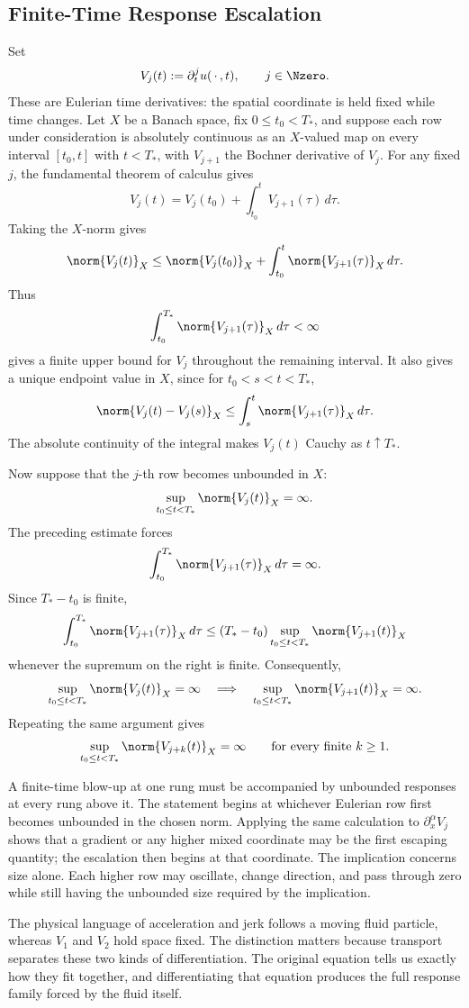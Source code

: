 
\subsection{Finite-Time Response Escalation}\label{sub:FiniteTimeResponseEscalation}

Set
\[
  V_j(t)
  :=
  \partial_t^j u(\,\cdot\,,t),
  \qquad
  j\in\Nzero.
\]
These are Eulerian time derivatives: the spatial coordinate is held fixed while time changes.
Let \(X\) be a Banach space, fix \(0\leq t_0<T_*\), and suppose each row under consideration is absolutely continuous as an \(X\)-valued map on every interval \([t_0,t]\) with \(t<T_*\), with \(V_{j+1}\) the Bochner derivative of \(V_j\).
For any fixed \(j\), the fundamental theorem of calculus gives
\[
  V_j(t)
  =
  V_j(t_0)
  +
  \int_{t_0}^{t}V_{j+1}(\tau)\,d\tau.
\]
Taking the \(X\)-norm gives
\[
  \norm{V_j(t)}_X
  \leq
  \norm{V_j(t_0)}_X
  +
  \int_{t_0}^{t}\norm{V_{j+1}(\tau)}_X\,d\tau.
\]
Thus
\[
  \int_{t_0}^{T_*}\norm{V_{j+1}(\tau)}_X\,d\tau
  <
  \infty
\]
gives a finite upper bound for \(V_j\) throughout the remaining interval.
It also gives a unique endpoint value in \(X\), since for \(t_0<s<t<T_*\),
\[
  \norm{V_j(t)-V_j(s)}_X
  \leq
  \int_s^t\norm{V_{j+1}(\tau)}_X\,d\tau.
\]
The absolute continuity of the integral makes \(V_j(t)\) Cauchy as \(t\uparrow T_*\).

Now suppose that the \(j\)-th row becomes unbounded in \(X\):
\[
  \sup_{t_0\leq t<T_*}
  \norm{V_j(t)}_X
  =
  \infty.
\]
The preceding estimate forces
\[
  \int_{t_0}^{T_*}
  \norm{V_{j+1}(\tau)}_X
  \,d\tau
  =
  \infty.
\]
Since \(T_*-t_0\) is finite,
\[
  \int_{t_0}^{T_*}
  \norm{V_{j+1}(\tau)}_X
  \,d\tau
  \leq
  (T_*-t_0)
  \sup_{t_0\leq t<T_*}
  \norm{V_{j+1}(t)}_X
\]
whenever the supremum on the right is finite.
Consequently,
\[
  \sup_{t_0\leq t<T_*}
  \norm{V_j(t)}_X
  =
  \infty
  \quad\Longrightarrow\quad
  \sup_{t_0\leq t<T_*}
  \norm{V_{j+1}(t)}_X
  =
  \infty.
\]
Repeating the same argument gives
\[
  \sup_{t_0\leq t<T_*}
  \norm{V_{j+k}(t)}_X
  =
  \infty
  \qquad
  \text{for every finite }k\geq1.
\]

A finite-time blow-up at one rung must be accompanied by unbounded responses at every rung above it.
The statement begins at whichever Eulerian row first becomes unbounded in the chosen norm.
Applying the same calculation to \(\partial_x^\alpha V_j\) shows that a gradient or any higher mixed coordinate may be the first escaping quantity; the escalation then begins at that coordinate.
The implication concerns size alone.
Each higher row may oscillate, change direction, and pass through zero while still having the unbounded size required by the implication.

The physical language of acceleration and jerk follows a moving fluid particle, whereas \(V_1\) and \(V_2\) hold space fixed.
The distinction matters because transport separates these two kinds of differentiation.
The original equation tells us exactly how they fit together, and differentiating that equation produces the full response family forced by the fluid itself.

